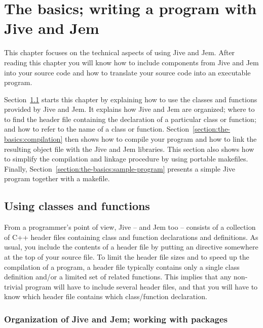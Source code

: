 
\chapter{The basics; writing a program with Jive and Jem}
\label{chapter:the-basics}

This chapter focuses on the technical aspects of using Jive and Jem.
After reading this chapter you will know how to include components from
Jive and Jem into your source code and how to translate your source code
into an executable program.

Section~\ref{section:the-basics:using-components} starts this chapter by
explaining how to use the classes and functions provided by Jive and Jem.
It explains how Jive and Jem are organized; where to to find the header
file containing the declaration of a particular class or function; and
how to refer to the name of a class or function.
Section~\ref{section:the-basics:compilation} then shows how to compile
your program and how to link the resulting object file with the Jive and
Jem libraries. This section also shows how to simplify the compilation
and linkage procedure by using portable makefiles. Finally,
Section~\ref{section:the-basics:sample-program} presents a simple Jive
program together with a makefile.


\section{Using classes and functions}
\label{section:the-basics:using-components}

From a programmer's point of view, Jive -- and Jem too -- consists of a
collection of C++ header files containing class and function declarations
and definitions. As usual, you include the contents of a header file by
putting an  directive somewhere at the top of your source
file. To limit the header file sizes and to speed up the compilation of a
program, a header file typically contains only a single class definition
and/or a limited set of related functions. This implies that any
non-trivial program will have to include several header files, and that
you will have to know which header file contains which class/function
declaration.


\subsection*{Organization of Jive and Jem; working with packages}

